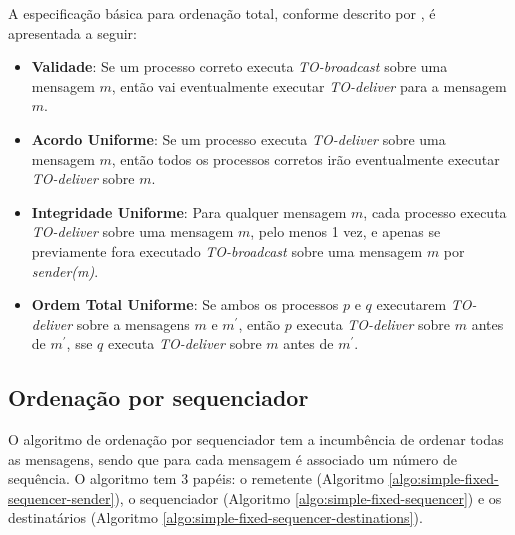 
A especificação básica para ordenação total,
conforme descrito por
\textcite{hadzilacos-10.5555/866693},
é apresentada a seguir:





\begin{itemize}
\item \textbf{Validade}: Se um processo correto executa \textit{TO-broadcast} sobre uma mensagem $m$, então vai eventualmente executar \textit{TO-deliver} para a mensagem $m$.
\item \textbf{Acordo Uniforme}: Se um processo executa \textit{TO-deliver} sobre uma mensagem $m$, então todos os processos corretos irão eventualmente executar \textit{TO-deliver} sobre $m$.
\item \textbf{Integridade Uniforme}: Para qualquer mensagem $m$, cada processo executa \textit{TO-deliver} sobre uma mensagem $m$, pelo menos 1 vez, e apenas se previamente fora executado \textit{TO-broadcast} sobre uma mensagem $m$ por \textit{sender(m)}.
\item \textbf{Ordem Total Uniforme}: Se ambos os processos $p$ e $q$ executarem \textit{TO-deliver} sobre a mensagens $m$ e $m^{'}$, então $p$ executa \textit{TO-deliver} sobre $m$ antes de $m^{'}$, sse $q$ executa \textit{TO-deliver} sobre $m$ antes de $m^{'}$.
\end{itemize}

\subsection{Ordenação por sequenciador}

O algoritmo de ordenação por sequenciador tem a incumbência de ordenar todas as mensagens, sendo que para cada mensagem é associado um número de sequência. O algoritmo tem 3 papéis: o remetente (Algoritmo \ref{algo:simple-fixed-sequencer-sender}), o sequenciador (Algoritmo \ref{algo:simple-fixed-sequencer}) e os destinatários (Algoritmo \ref{algo:simple-fixed-sequencer-destinations}).

